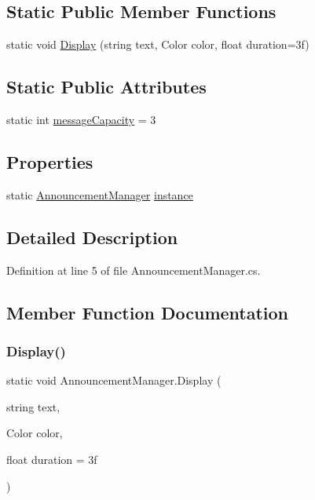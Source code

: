 \subsection*{Static Public Member Functions}
\begin{DoxyCompactItemize}
\item 
static void \mbox{\hyperlink{class_announcement_manager_a931bdfbc829e1165fdbd7a3a848e95d1}{Display}} (string text, Color color, float duration=3f)
\end{DoxyCompactItemize}
\subsection*{Static Public Attributes}
\begin{DoxyCompactItemize}
\item 
static int \mbox{\hyperlink{class_announcement_manager_aa23d155cc088be3437ef92cc337c0492}{message\+Capacity}} = 3
\end{DoxyCompactItemize}
\subsection*{Properties}
\begin{DoxyCompactItemize}
\item 
static \mbox{\hyperlink{class_announcement_manager}{Announcement\+Manager}} \mbox{\hyperlink{class_announcement_manager_a23f0a77f19174bf82815db8a2c3f4c94}{instance}}
\end{DoxyCompactItemize}


\subsection{Detailed Description}


Definition at line 5 of file Announcement\+Manager.\+cs.



\subsection{Member Function Documentation}
\mbox{\label{class_announcement_manager_a931bdfbc829e1165fdbd7a3a848e95d1}} 
\subsubsection{\texorpdfstring{Display()}{Display()}}
{\footnotesize\ttfamily static void Announcement\+Manager.\+Display (\begin{DoxyParamCaption}\item[{string}]{text,  }\item[{Color}]{color,  }\item[{float}]{duration = {\ttfamily 3f} }\end{DoxyParamCaption})\hspace{0.3cm}{\ttfamily [static]}}



